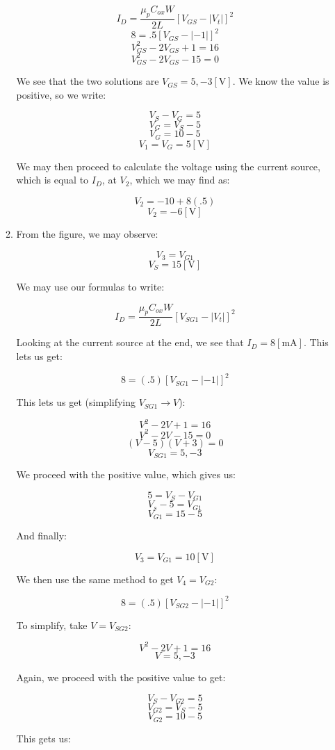 \begin{enumerate}
\begin{enumerate}
        $$I_D=\frac{\mu_pC_{ox}W}{2L}[V_{GS}-|V_{t}|]^2$$
        $$8=.5[V_{GS}-|-1|]^2$$
        $$V_{GS}^2-2V_{GS}+1=16$$
        $$V_{GS}^2-2V_{GS}-15=0$$

        We see that the two solutions are $V_{GS}=5,-3[\si{\volt}]$. We know the value is positive, so we write:

        $$V_S-V_G=5$$
        $$V_G=V_S-5$$
        $$V_G=10-5$$
        $$\boxed{V_1=V_G=5[\si{\volt}]}$$

        We may then proceed to calculate the voltage using the current source, which is equal to $I_D$, at $V_2$, which we may find as:

        $$V_2=-10+8(.5)$$
        $$\boxed{V_2=-6[\si{\volt}]}$$

      \item From the figure, we may observe:

        $$V_3=V_{G1}$$
        $$V_S=15[\si{\volt}]$$

        We may use our formulas to write:

        $$I_D=\frac{\mu_p C_{ox}W}{2L}[V_{SG1}-|V_t|]^2$$

        Looking at the current source at the end, we see that $I_D=8[\si{\milli\ampere}]$. This lets us get:

        $$8=(.5)[V_{SG1}-|-1|]^2$$

        This lets us get (simplifying $V_{SG1}\to V$):

        $$V^2-2V+1=16$$
        $$V^2-2V-15=0$$
        $$(V-5)(V+3)=0$$
        $$V_{SG1}=5,-3$$

        We proceed with the positive value, which gives us:

        $$5=V_S-V_{G1}$$
        $$V_s-5=V_{G1}$$
        $$V_{G1}=15-5$$

        And finally:

        $$\boxed{V_3=V_{G1}=10[\si{\volt}]}$$

        We then use the same method to get $V_4=V_{G2}$:

        $$8=(.5)[V_{SG2}-|-1|]^2$$

        To simplify, take $V=V_{SG2}$:

        $$V^2-2V+1=16$$
        $$V=5,-3$$

        Again, we proceed with the positive value to get:

        $$V_{S}-V_{G2}=5$$
        $$V_{G2}=V_S-5$$
        $$V_{G2}=10-5$$

        This gets us:


\end{enumerate}
\end{enumerate}
